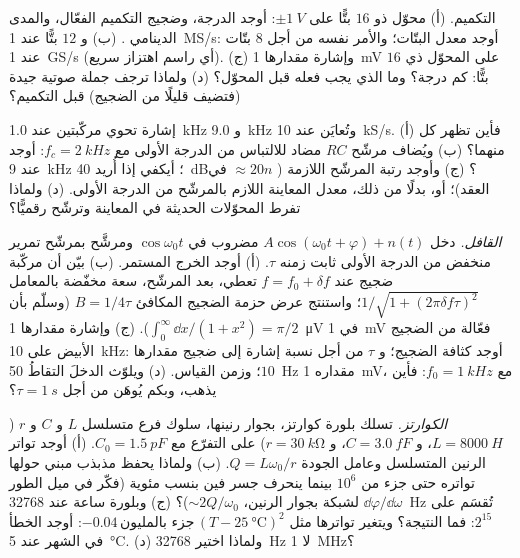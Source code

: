 \begin{exercise}[$\star\star$]\label{exo:b2:feedback-oscillators:8}
التكميم. (أ) محوّل ذو $16$ بتًّا على $\pm\qty{1}{V}$: أوجد الدرجة، وضجيج
التكميم الفعّال، والمدى الدينامي . (ب) و $12$ بتًّا عند
\qty{1}{MS/s}: أوجد معدل البتّات؛ والأمر نفسه من أجل $8$ بتّات عند \qty{1}{GS/s} (أي راسم اهتزاز
سريع). (ج) وإشارة مقدارها \qty{1}{mV} على المحوّل ذي $16$ بتًّا: كم
درجة؟ وما الذي يجب فعله قبل المحوّل؟ (د) ولماذا ترجف جملة صوتية
جيدة (فتضيف قليلًا من الضجيج) قبل التكميم؟
\end{exercise}

\begin{exercise}[$\star\star$]\label{exo:b2:feedback-oscillators:9}
إشارة تحوي مركّبتين عند \qty{1.0}{kHz} و \qty{9.0}{kHz} وتُعايَن
عند \qty{10}{kS/s}. (أ) فأين تظهر كل منهما؟ (ب) ويُضاف
مرشّح $RC$ مضاد للالتباس من الدرجة الأولى مع $f_c = \qty{2}{kHz}$:
أوجد  عند \qty{9}{kHz} ؛ أيكفي إذا أُريد \qty{40}{dB}؟ (ج)
وأوجد رتبة المرشّح اللازمة ( $\approx 20n$  في العقد)؛ أو،
بدلًا من ذلك، معدل المعاينة اللازم بالمرشّح من الدرجة الأولى. (د)
ولماذا تفرط المحوّلات الحديثة في المعاينة وترشّح رقميًّا؟
\end{exercise}

\begin{exercise}[$\star\star\star$]\label{exo:b2:feedback-oscillators:10}
\emph{القافل.} دخل $A\cos(\omega_0t + \varphi) + n(t)$ مضروب في $\cos\omega_0t$
ومرشَّح بمرشّح تمرير منخفض من الدرجة الأولى ثابت زمنه $\tau$. (أ) أوجد الخرج
المستمر. (ب) بيّن أن مركّبة ضجيج عند $f = f_0 + \delta f$ تعطي، بعد
المرشّح، سعة مخفّضة بالمعامل $1/\sqrt{1 + (2\pi\delta f\tau)^2}$؛
واستنتج عرض حزمة الضجيج المكافئ $B = 1/4\tau$ (وسلّم بأن $\int_0^\infty
\dd x/(1 + x^2) = \pi/2$). (ج) وإشارة مقدارها \qty{1}{\micro V} في \qty{1}{mV} فعّالة من
الضجيج الأبيض على \qty{10}{kHz}: أوجد كثافة الضجيج؛ و $\tau$ من أجل نسبة إشارة
إلى ضجيج مقدارها $10$؛ وزمن القياس. (د) ويلوّث الدخلَ التقاطُ \qty{50}{Hz}
مقداره \qty{1}{mV}، مع $f_0 = \qty{1}{kHz}$: فأين يذهب، وبكم
يُوهَن من أجل $\tau = \qty{1}{s}$؟
\end{exercise}

\begin{exercise}[$\star\star\star$]\label{exo:b2:feedback-oscillators:11}
\emph{الكوارتز.} تسلك بلورة كوارتز، بجوار رنينها، سلوك
فرع متسلسل $L$ و $C$ و $r$ ($L = \qty{8000}{H}$، و $C = \qty{3.0}{fF}$، و $r =
\qty{30}{k\ohm}$) على التفرّع مع $C_0 = \qty{1.5}{pF}$. (أ) أوجد تواتر الرنين
المتسلسل وعامل الجودة $Q = L\omega_0/r$. (ب) ولماذا يحفظ مذبذب
مبني حولها تواتره حتى جزء من $10^6$ بينما ينحرف جسر
فين بنسب مئوية (فكّر في ميل الطور $\dd\varphi/\dd\omega$ لشبكة
 بجوار الرنين، $\sim 2Q/\omega_0$)؟ (ج) وبلورة ساعة
عند \qty{32768}{Hz} تُقسَم على $2^{15}$: فما النتيجة؟ ويتغير تواترها
مثل $-0.04\,\text{جزء بالمليون}\,(T - \qty{25}{\degreeCelsius})^2$: أوجد الخطأ في
الشهر عند \qty{5}{\degreeCelsius}. (د) ولماذا اختير \qty{32768}{Hz} لا
\qty{1}{MHz}؟
\end{exercise}

